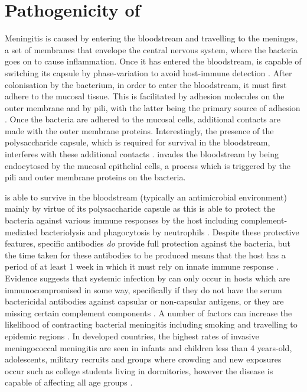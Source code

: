 \section{Pathogenicity of \Nm{}}
Meningitis is caused by \Nm{} entering the bloodstream and travelling to the meninges, a set of membranes that envelope the central nervous system, where the bacteria goes on to cause inflammation. Once it has entered the bloodstream, \Nm{} is capable of switching its capsule by phase-variation to avoid host-immune detection \cite{Beddek2009,Moxon1994}. After colonisation by the bacterium, in order to enter the bloodstream, it must first adhere to the mucosal tissue. This is facilitated by adhesion molecules on the outer membrane and by pili, with the latter being the primary source of adhesion \cite{Deuren2000,Carbonnelle2009}. Once the bacteria are adhered to the mucosal cells, additional contacts are made with the outer membrane proteins. Interestingly, the presence of the polysaccharide capsule, which is required for survival in the bloodstream, interferes with these additional contacts \cite{Stephens2009}. \Nm{} invades the bloodstream by being endocytosed by the mucosal epithelial cells, a process which is triggered by the pili and outer membrane proteins on the bacteria.

\Nm{} is able to survive in the bloodstream (typically an antimicrobial environment) mainly by virtue of its polysaccharide capsule as this is able to protect the bacteria against various immune responses by the host including complement-mediated bacteriolysis and phagocytosis by neutrophils \cite{Deuren2000}.
Despite these protective features, specific antibodies \textit{do} provide full protection against the bacteria, but the time taken for these antibodies to be produced means that the host has a period of at least 1 week in which it must rely on innate immune response \cite{Deuren2000}. Evidence suggests that systemic infection by \Nm{} can only occur in hosts which are immunocompromised in some way, specifically if they do not have the serum bactericidal antibodies against capsular or non-capsular antigens, or they are missing certain complement components \cite{DeVoe1982}. A number of factors can increase the likelihood of contracting bacterial meningitis including smoking and travelling to epidemic regions \cite{Stephens2009}. In developed countries, the highest rates of invasive meningococcal meningitis are seen in infants and children less than 4 years-old, adolescents, military recruits and groups where crowding and new exposures occur such as college students living in dormitories, however the disease is capable of affecting all age groups \cite{Stephens2009}.

